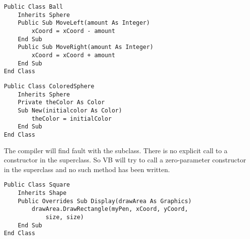 		\begin{stab}
			\begin{enumChapter}
				\item	
					\begin{lstlisting}
Public Class Ball
	Inherits Sphere
	Public Sub MoveLeft(amount As Integer)
		xCoord = xCoord - amount
	End Sub	
	Public Sub MoveRight(amount As Integer)
		xCoord = xCoord + amount
	End Sub
End Class
					\end{lstlisting}
				\item
					\begin{lstlisting}
Public Class ColoredSphere
	Inherits Sphere
	Private theColor As Color
	Sub New(initialcolor As Color)
		theColor = initialColor
	End Sub
End Class
					\end{lstlisting}
				\item	The compiler will find fault with the subclass. There is no explicit call to a constructor in the superclass. So VB will try to call a zero-parameter constructor in the superclass and no such method has been written.
				\item
					\begin{lstlisting}
Public Class Square
	Inherits Shape
	Public Overrides Sub Display(drawArea As Graphics)
		drawArea.DrawRectangle(myPen, xCoord, yCoord,
			size, size)
	End Sub
End Class
					\end{lstlisting}
			\end{enumChapter}
		\end{stab}

